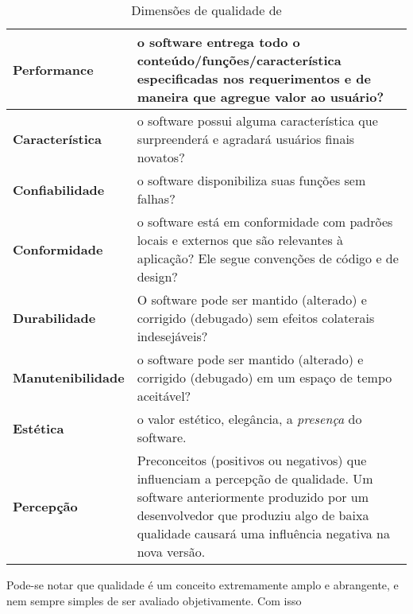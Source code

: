 \documentclass[
	12pt,				%
	openright,			%
	twoside,			%
	a4paper,			%
	english,			%
	brazil,				%
	]{abntex2}
\begin{document}
\begin{table}[h]
    \caption{Dimensões de qualidade de }
    \label{tab:qualidade_garvin}
    \begin{tabular}{p{3.7cm}|p{11cm}}
        \textbf{Performance} & o software entrega todo o conteúdo/funções/característica especificadas nos requerimentos e de maneira que agregue valor ao usuário? \\ \hline
        \textbf{Característica} & o software possui alguma característica que surpreenderá e agradará usuários finais novatos? \\ \hline
        \textbf{Confiabilidade} & o software disponibiliza suas funções sem falhas? \\ \hline
        \textbf{Conformidade} & o software está em conformidade com padrões locais e externos que são relevantes à aplicação? Ele segue convenções de código e de design? \\ \hline
        \textbf{Durabilidade} & O software pode ser mantido (alterado) e corrigido (debugado) sem efeitos colaterais indesejáveis? \\ \hline
        \textbf{Manutenibilidade} & o software pode ser mantido (alterado) e corrigido (debugado) em um espaço de tempo aceitável? \\ \hline
        \textbf{Estética} & o valor estético, elegância, a \emph{presença} do software.\\ \hline
        \textbf{Percepção} & Preconceitos (positivos ou negativos) que influenciam a percepção de qualidade. Um software anteriormente produzido por um desenvolvedor que produziu algo de baixa qualidade causará uma influência negativa na nova versão.\\
  \end{tabular}
\end{table}

Pode-se notar que qualidade é um conceito extremamente amplo e abrangente, e nem sempre simples de ser avaliado objetivamente. Com isso  %


\end{document}
